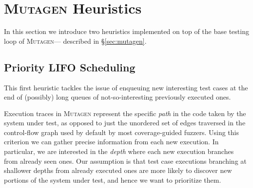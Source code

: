\documentclass[sigconf,review,anonymous]{acmart}
\newcommand{\fuzzchick}{\textit{FuzzChick}\xspace}
\newcommand{\mutagen}{\textsc{Mutagen}\xspace}
\begin{document}
%



\section{\mutagen Heuristics}
\label{sec:heuristics}

In this section we introduce two heuristics implemented on top of the base
testing loop of \mutagen --- described in \S \ref{sec:mutagen}.

\subsection{Priority LIFO Scheduling}

This first heuristic tackles the issue of enqueuing new interesting test cases
at the end of (possibly) long queues of not-so-interesting previously executed
ones.

Execution traces in \mutagen represent the specific \emph{path} in the code
taken by the system under test, as opposed to just the unordered set of edges
traversed in the control-flow graph used by default by most coverage-guided
fuzzers.
%
Using this criterion we can gather precise information from each new execution.
%
In particular, we are interested in the \emph{depth} where each new execution
branches from already seen ones.
%
Our assumption is that test case executions branching at shallower depths from
already executed ones are more likely to discover new portions of the system
under test, and hence we want to prioritize them.
\end{document}
